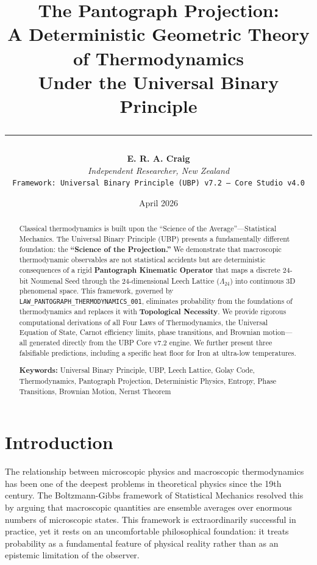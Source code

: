 \documentclass[12pt,a4paper]{article}
\title{
  \vspace{-1cm}
  {\Large \textbf{The Pantograph Projection:}}\\[0.3cm]
  {\large A Deterministic Geometric Theory of Thermodynamics\\
  Under the Universal Binary Principle}\\[0.5cm]
  \rule{\linewidth}{0.5pt}
}
\author{
  \textbf{E. R. A. Craig}\\
  \textit{Independent Researcher, New Zealand}\\[0.2cm]
  \texttt{Framework: Universal Binary Principle (UBP) v7.2 — Core Studio v4.0}
}
\date{April 2026}
\begin{document}
\maketitle
\thispagestyle{fancy}

\begin{abstract}
\noindent
Classical thermodynamics is built upon the ``Science of the Average''---Statistical Mechanics. The Universal Binary Principle (UBP) presents a fundamentally different foundation: the \textbf{``Science of the Projection.''} We demonstrate that macroscopic thermodynamic observables are not statistical accidents but are deterministic consequences of a rigid \textbf{Pantograph Kinematic Operator} that maps a discrete 24-bit Noumenal Seed through the 24-dimensional Leech Lattice ($\Lambda_{24}$) into continuous 3D phenomenal space. This framework, governed by \texttt{LAW\_PANTOGRAPH\_THERMODYNAMICS\_001}, eliminates probability from the foundations of thermodynamics and replaces it with \textbf{Topological Necessity}. We provide rigorous computational derivations of all Four Laws of Thermodynamics, the Universal Equation of State, Carnot efficiency limits, phase transitions, and Brownian motion---all generated directly from the UBP Core v7.2 engine. We further present three falsifiable predictions, including a specific heat floor for Iron at ultra-low temperatures.

\vspace{0.3cm}
\noindent\textbf{Keywords:} Universal Binary Principle, UBP, Leech Lattice, Golay Code, Thermodynamics, Pantograph Projection, Deterministic Physics, Entropy, Phase Transitions, Brownian Motion, Nernst Theorem
\end{abstract}

\tableofcontents
\newpage

\section{Introduction}

The relationship between microscopic physics and macroscopic thermodynamics has been one of the deepest problems in theoretical physics since the 19th century. The Boltzmann-Gibbs framework of Statistical Mechanics resolved this by arguing that macroscopic quantities are ensemble averages over enormous numbers of microscopic states. This framework is extraordinarily successful in practice, yet it rests on an uncomfortable philosophical foundation: it treats probability as a fundamental feature of physical reality rather than as an epistemic limitation of the observer.
\end{document}
